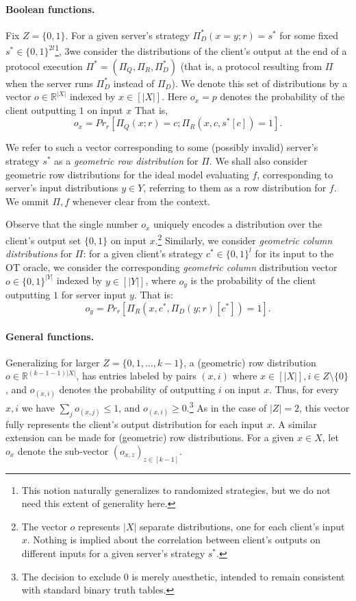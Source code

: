\documentclass[a4paper]{article}
\newcommand{\R}{\mathbb{R}}
\begin{document}
\paragraph{Boolean functions.} Fix $Z=\{0,1\}$. For a given server's strategy $\Pi^*_D(x=y;r)=s^*$ for some fixed $s^*\in\{0,1\}^{2l}$\footnote{This notion naturally generalizes to randomized strategies, but we do not need this extent of generality here.}, 3we consider the distributions of the client's output at the end of a protocol execution $\Pi^*=(\Pi_Q,\Pi_R,\Pi^*_D)$ (that is, a protocol resulting from $\Pi$ when the server runs $\Pi^*_D$ instead of $\Pi_D$). We denote this set of distributions
by a vector $o\in \R^{|X|}$ indexed by $x\in [|X|]$. Here $o_x=p$ denotes the probability of the client outputting $1$ on input $x$
That is,
\[o_x = Pr_r[\Pi_Q(x;r)=c;\Pi_R(x,c,s^*[c])=1].\]

We refer to such a vector corresponding to some (possibly invalid) server's strategy $s^*$ as a \emph{geometric row distribution} for $\Pi$. 
We shall also consider geometric row distributions for the ideal model evaluating $f$, corresponding to server's input distributions $y\in Y$, referring to them as a row distribution for $f$. We ommit $\Pi,f$ whenever clear from the context.

Observe that the single number $o_x$ uniquely encodes a distribution over the client's output set $\{0,1\}$ on input $x$.\footnote{The vector $o$ represents $|X|$ separate distributions, one for each client's input $x$. Nothing is implied about the correlation between client's outputs on different inputs for a given server's strategy $s^*$.} Similarly, we consider \emph{geometric column distributions} for $\Pi$: for a given client's strategy $c^*\in\{0,1\}^l$ for its input to the OT oracle, we consider the corresponding \emph{geometric column} distribution vector $o\in \{0,1\}^{|Y|}$ indexed by  $y\in [|Y|]$, where $o_y$ is the probability of the client outputting $1$ for server input $y$. That is:
\[o_y = Pr_r[\Pi_R(x,c^*,\Pi_D(y;r)[c^*])=1].\]

\paragraph{General functions.} Generalizing for larger $Z=\{0,1,\ldots,k-1\}$, a (geometric) row distribution $o\in \mathbb{R}^{(k-1-1)|X|}$, has entries labeled by
pairs $(x,i)$ where $x\in [|X|],i\in Z\setminus{\{0\}}$, and $o_{(x,i)}$ denotes the probability of outputting $i$ on input $x$. Thus, for every $x,i$ we have $\sum_j o_{(x,j)}\leq 1$, and $o_{(x,i)}\geq 0$.\footnote{The decision to exclude 0 is merely auesthetic, intended to remain consistent with standard binary truth tables.}
As in the case of $|Z|=2$, this vector fully represents the client's output distribution for each input $x$. A similar extension can be made for (geometric) row distributions. For a given $x\in X$, let $o_x$ denote the sub-vector $(o_{x,z})_{z\in [k-1]}$.
\end{document}
